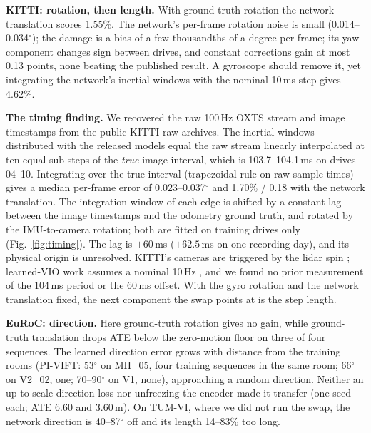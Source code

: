 \documentclass[letterpaper,journal]{IEEEtran}
\begin{document}
\textbf{KITTI: rotation, then length.} With ground-truth rotation the network translation scores 1.55\%. The network's per-frame rotation noise is small (0.014--0.034$^\circ$); the damage is a bias of a few thousandths of a degree per frame; its yaw component changes sign between drives, and constant corrections gain at most 0.13 points, none beating the published result. A gyroscope should remove it, yet integrating the network's inertial windows with the nominal 10\,ms step gives 4.62\%.

\textbf{The timing finding.} We recovered the raw 100\,Hz OXTS stream and image timestamps from the public KITTI raw archives. The inertial windows distributed with the released models equal the raw stream linearly interpolated at ten equal sub-steps of the \emph{true} image interval, which is 103.7--104.1\,ms on drives 04--10. Integrating over the true interval (trapezoidal rule on raw sample times) gives a median per-frame error of 0.023--0.037$^\circ$ and 1.70\% / 0.18 with the network translation. The integration window of each edge is shifted by a constant lag between the image timestamps and the odometry ground truth, and rotated by the IMU-to-camera rotation; both are fitted on training drives only (Fig.~\ref{fig:timing}). The lag is $+60$\,ms ($+62.5$\,ms on one recording day), and its physical origin is unresolved. KITTI's cameras are triggered by the lidar spin \cite{Geiger2013}; learned-VIO work assumes a nominal 10\,Hz \cite{Yang2022,Kurt2024,Wan2026,Almalioglu2022}, and we found no prior measurement of the 104\,ms period or the 60\,ms offset. With the gyro rotation and the network translation fixed, the next component the swap points at is the step length.

\textbf{EuRoC: direction.} Here ground-truth rotation gives no gain, while ground-truth translation drops ATE below the zero-motion floor on three of four sequences. The learned direction error grows with distance from the training rooms (PI-VIFT: 53$^\circ$ on MH\_05, four training sequences in the same room; 66$^\circ$ on V2\_02, one; 70--90$^\circ$ on V1, none), approaching a random direction. Neither an up-to-scale direction loss \cite{Wang2020} nor unfreezing the encoder made it transfer (one seed each; ATE 6.60 and 3.60\,m). On TUM-VI, where we did not run the swap, the network direction is 40--87$^\circ$ off and its length 14--83\% too long.
\end{document}

